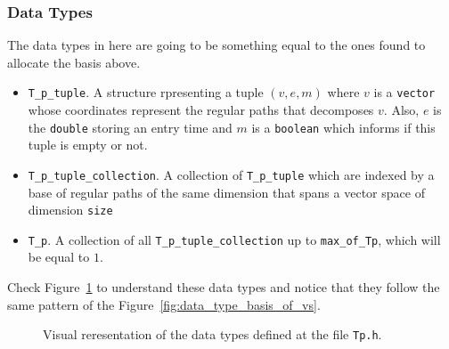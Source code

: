\documentclass[11pt,a4paper]{article}
\begin{document}
\subsubsection{Data Types}
The data types in here are going to be something equal to the ones found
to allocate the basis above.
\begin{itemize}
	\item \texttt{T\_p\_tuple}. A structure rpresenting a tuple $(v,e,m)$
		where $v$ is a \texttt{vector} whose coordinates represent
		the regular paths that decomposes $v$. Also, $e$
		is the \texttt{double} storing an entry time
		and $m$ is a \texttt{boolean} which informs
		if this tuple is empty or not.

	\item \texttt{T\_p\_tuple\_collection}. A collection of \texttt{T\_p\_tuple} which
		are indexed by a base of regular paths of the same dimension
		that spans a vector space of dimension \texttt{size}

	\item \texttt{T\_p}. A collection of all \texttt{T\_p\_tuple\_collection} up to \texttt{max\_of\_Tp},
		which will be equal to $1$.
\end{itemize}
Check Figure~\ref{fig:Tp} to understand these data types and notice that 
they follow the same pattern of the Figure~\ref{fig:data_type_basis_of_vs}.
\begin{figure}[H]
	\caption{Visual reresentation of the data types defined at the file \texttt{Tp.h}.}
	\label{fig:Tp}
\end{figure}
\end{document}
